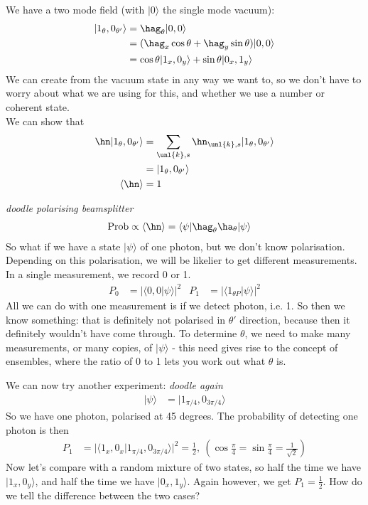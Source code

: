 \documentclass[a4paper, 11pt, normalem]{report}
\begin{document}
\begin{example}
    We have a two mode field (with $|0\rangle$ the single mode vacuum):
    \begin{align}
        |1_\theta,0_{\theta'}\rangle &= \hag_\theta|0,0\rangle \\
                                     &= (\hag_x\cos\theta+\hag_y\sin\theta)|0,0\rangle \\
                                     &= \cos\theta|1_x,0_y\rangle + \sin\theta|0_x,1_y\rangle
    \end{align}
    We can create from the vacuum state in any way we want to, so we don't have to worry about what we are using for this, and whether we use a number or coherent state.\\
    We can show that
    \begin{align}
        \hn|1_\theta,0_{\theta'}\rangle &= \sum_{\unl{k},s} \hn_{\unl{k},s}|1_\theta,0_{\theta'}\rangle \\
                                        &= |1_\theta,0_{\theta'}\rangle \\
        \langle\hn\rangle &= 1
    \end{align}
\end{example}

\textit{doodle polarising beamsplitter}
\begin{align}
    \text{Prob} &\propto \langle\hn\rangle = \langle\psi|\hag_\theta\ha_\theta|\psi\rangle
\end{align}
So what if we have a state $|\psi\rangle$ of one photon, but we don't know polarisation. 
Depending on this polarisation, we will be likelier to get different measurements. 
In a single measurement, we record 0 or 1.
\begin{align}
    P_0 &= |\langle0,0|\psi\rangle|^2 & P_1 &= |\langle1_{\theta P}|\psi\rangle|^2
\end{align}
All we can do with one measurement is if we detect photon, i.e. 1. 
So then we know something: that is definitely not polarised in $\theta'$ direction, because then it definitely wouldn't have come through. 
To determine $\theta$, we need to make many measurements, or many copies, of $|\psi\rangle$ - this need gives rise to the concept of ensembles, where the ratio of 0 to 1 lets you work out what $\theta$ is. 

We can now try another experiment:
\textit{doodle again}
\begin{align}
    |\psi\rangle &= |1_{\pi/4},0_{3\pi/4}\rangle
\end{align}
So we have one photon, polarised at 45 degrees. 
The probability of detecting one photon is then
\begin{align}
    P_1 &= |\langle1_x,0_x|1_{\pi/4},0_{3\pi/4}\rangle|^2 = \frac12,~ (\cos\frac{\pi}{4} = \sin\frac{\pi}{4} = \frac{1}{\sqrt{2}})
\end{align}
Now let's compare with a random mixture of two states, so half the time we have $|1_x,0_y\rangle$, and half the time we have $|0_x,1_y\rangle$.
Again however, we get $P_1=\frac12$. 
How do we tell the difference between the two cases?
\end{document}
